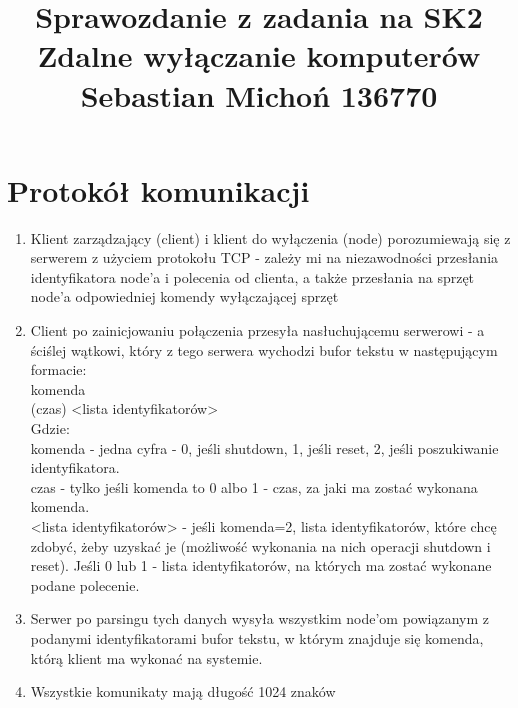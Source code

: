 \documentclass[12pt]{article}
\begin{document}
\title{Sprawozdanie z zadania na SK2\\
\large Zdalne wyłączanie komputerów\\
\large Sebastian Michoń 136770}
\date{\vspace{-10ex}}
\maketitle

\section{Protokół komunikacji}
\begin {enumerate}
	\item Klient zarządzający (client) i klient do wyłączenia (node) porozumiewają się z serwerem z użyciem protokołu TCP - zależy mi na niezawodności przesłania identyfikatora node'a i polecenia od clienta, 
	a także przesłania na sprzęt node'a odpowiedniej komendy wyłączającej sprzęt
	\item Client po zainicjowaniu połączenia przesyła nasłuchującemu serwerowi - a ściślej wątkowi, który z tego serwera wychodzi bufor tekstu w następującym formacie:\\
	komenda\\
	(czas) <lista identyfikatorów>\\
	Gdzie:\\
	komenda - jedna cyfra - 0, jeśli shutdown, 1, jeśli reset, 2, jeśli poszukiwanie identyfikatora.\\
	czas - tylko jeśli komenda to 0 albo 1 - czas, za jaki ma zostać wykonana komenda.\\
	<lista identyfikatorów> - jeśli komenda=2, lista identyfikatorów, które chcę zdobyć, żeby uzyskać je (możliwość wykonania na nich operacji shutdown i reset). Jeśli 0 lub 1 - lista identyfikatorów, na których ma zostać wykonane podane polecenie.
	
	\item Serwer po parsingu tych danych wysyła wszystkim node'om powiązanym z podanymi identyfikatorami bufor tekstu, w którym znajduje się komenda, którą klient ma wykonać na systemie.
	
	\item Wszystkie komunikaty mają długość 1024 znaków
\end {enumerate}
\end{document}
